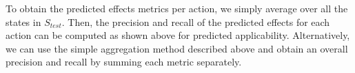 \documentclass{article}
\theoremstyle{definition}
\theoremstyle{remark}
\newcommand{\stest}{\ensuremath{S_{\textit{test}}}\xspace}
\newif\ifaddcomments
\newcommand{\roni}[1]{\ifaddcomments{\textcolor{red}{[Roni: #1]}}\fi}
\newcommand{\gregor}[1]{\ifaddcomments{\textcolor{orange}{[Gregor: #1]}}\fi}
\newcommand{\leo}[1]{\ifaddcomments{\textcolor{pink}{[Leonardo: #1]}}\fi}
\begin{document}
To obtain the predicted effects metrics per action, we simply average over all the states in $\stest$. Then, the precision and recall of the predicted effects for each action can be computed as shown above for predicted applicability. 
Alternatively, we can use the simple aggregation method described above and obtain an overall precision and recall by summing each metric separately. 


\roni{After some thought, I don't think the discussion about the difference between predicted effects and syntactic effects is good. The syntactic does not measure w.r.t a test set of state while the predicted effects does, and does not need a reference domain.}



\end{document}
